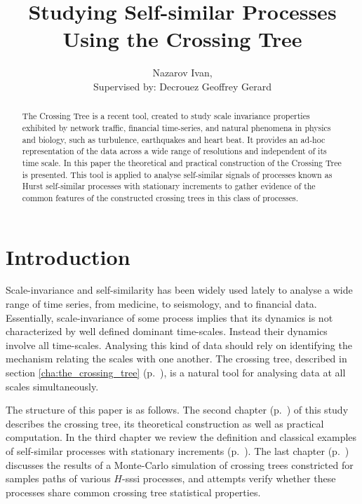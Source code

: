 \documentclass[a4paper]{extreport}
\title{Studying Self-similar Processes Using the Crossing Tree}
\author{Nazarov Ivan, \rus{101мНОД(ИССА)}\\
	{\small Supervised by: Decrouez Geoffrey Gerard}}
\begin{document}
\maketitle
\begin{abstract}
The Crossing Tree is a recent tool, created to study scale invariance properties
exhibited by network traffic, financial time-series, and natural phenomena in physics
and biology, such as turbulence, earthquakes and heart beat. It provides an ad-hoc
representation of the data across a wide range of resolutions and independent of
its time scale. In this paper the theoretical and practical construction of the Crossing
Tree is presented. This tool is applied to analyse self-similar signals of processes
known as Hurst self-similar processes with stationary increments to gather evidence 
of the common features of the constructed crossing trees in this class of processes.
\end{abstract}
\tableofcontents

\chapter{Introduction} %
\label{cha:introduction}

Scale-invariance and self-similarity has been widely used lately to analyse a wide
range of time series, from medicine, to seismology, and to financial data.
Essentially, scale-invariance of some process implies that its dynamics is not
characterized by well defined dominant time-scales. Instead their dynamics
involve all time-scales. Analysing this kind of data should rely on identifying
the mechanism relating the scales with one another. The crossing tree, described in
section \ref{cha:the_crossing_tree} (p.~\pageref{cha:the_crossing_tree}), is
a natural tool for analysing data at all scales simultaneously.

The structure of this paper is as follows. The second chapter (p.~\pageref{cha:the_crossing_tree})
of this study describes the crossing tree, its theoretical construction as well as practical
computation. In the third chapter we review the definition and classical examples
of self-similar processes with stationary increments (p.~\pageref{cha:h_sssi_processes}).
The last chapter (p.~\pageref{cha:the_crossing_tree_and_h_sssi_processes}) discusses
the results of a Monte-Carlo simulation of crossing trees constricted for samples paths
of various $H$-sssi processes, and attempts verify whether these processes share
common crossing tree statistical properties.
\end{document}
